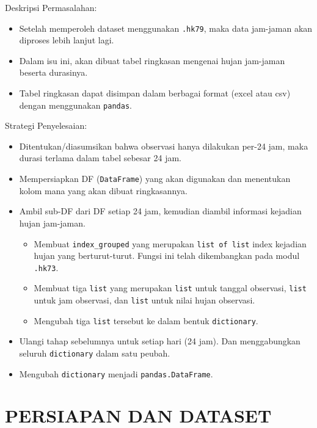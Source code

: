 \documentclass[11pt]{article}
\providecommand{\tightlist}{%
      \setlength{\itemsep}{0pt}\setlength{\parskip}{0pt}}
\begin{document}
Deskripsi Permasalahan:

\begin{itemize}
\tightlist
\item
  Setelah memperoleh dataset menggunakan \texttt{.hk79}, maka data
  jam-jaman akan diproses lebih lanjut lagi.
\item
  Dalam isu ini, akan dibuat tabel ringkasan mengenai hujan jam-jaman
  beserta durasinya.
\item
  Tabel ringkasan dapat disimpan dalam berbagai format (excel atau csv)
  dengan menggunakan \texttt{pandas}.
\end{itemize}

Strategi Penyelesaian:

\begin{itemize}
\tightlist
\item
  Ditentukan/diasumsikan bahwa observasi hanya dilakukan per-24 jam,
  maka durasi terlama dalam tabel sebesar 24 jam.
\item
  Mempersiapkan DF (\texttt{DataFrame}) yang akan digunakan dan
  menentukan kolom mana yang akan dibuat ringkasannya.
\item
  Ambil sub-DF dari DF setiap 24 jam, kemudian diambil informasi
  kejadian hujan jam-jaman.

  \begin{itemize}
  \tightlist
  \item
    Membuat \texttt{index\_grouped} yang merupakan
    \texttt{list\ of\ list} index kejadian hujan yang berturut-turut.
    Fungsi ini telah dikembangkan pada modul \texttt{.hk73}.
  \item
    Membuat tiga \texttt{list} yang merupakan \texttt{list} untuk
    tanggal observasi, \texttt{list} untuk jam observasi, dan
    \texttt{list} untuk nilai hujan observasi.
  \item
    Mengubah tiga \texttt{list} tersebut ke dalam bentuk
    \texttt{dictionary}.
  \end{itemize}
\item
  Ulangi tahap sebelumnya untuk setiap hari (24 jam). Dan menggabungkan
  seluruh \texttt{dictionary} dalam satu peubah.
\item
  Mengubah \texttt{dictionary} menjadi \texttt{pandas.DataFrame}.
\end{itemize}

    \hypertarget{persiapan-dan-dataset}{%
\section{PERSIAPAN DAN DATASET}\label{persiapan-dan-dataset}}
\end{document}
